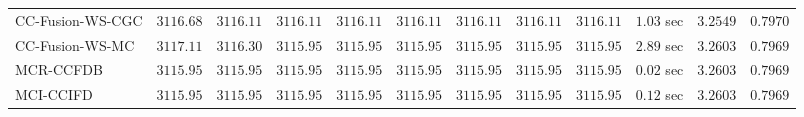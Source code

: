 \begin{table}[H]
\begin{tabular}{lrrrrrrrrrrr}
    CC-Fusion-WS-CGC & $      3116.68$ & $      3116.11$ & $      3116.11$ & $      3116.11$ & $      3116.11$ & $      3116.11$ & $      3116.11$ & $      3116.11$ & $         1.03$ sec    & $       3.2549$  & $       0.7970$ \\ 
     CC-Fusion-WS-MC & $      3117.11$ & $      3116.30$ & $      3115.95$ & $      3115.95$ & $      3115.95$ & $      3115.95$ & $      3115.95$ & $      3115.95$ & $         2.89$ sec    & $       3.2603$  & $       0.7969$ \\ 
\cmidrule{1-1} 
           MCR-CCFDB & $      3115.95$ & $      3115.95$ & $      3115.95$ & $      3115.95$ & $      3115.95$ & $      3115.95$ & $      3115.95$ & $      3115.95$ & $         0.02$ sec    & $       3.2603$  & $       0.7969$ \\ 
\cmidrule{1-1} 
           MCI-CCIFD & $      3115.95$ & $      3115.95$ & $      3115.95$ & $      3115.95$ & $      3115.95$ & $      3115.95$ & $      3115.95$ & $      3115.95$ & $         0.12$ sec    & $       3.2603$  & $       0.7969$ \\ 
\bottomrule
\end{tabular}
\end{table}

